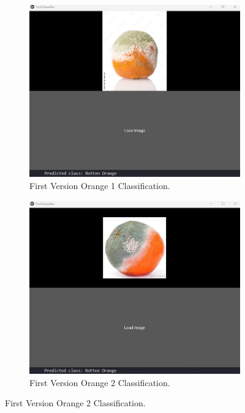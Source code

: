 \documentclass[conference]{IEEEtran}
\begin{document}
\begin{figure}[h]
\begin{subfigure}[b]{0.48\linewidth}
        \label{figFB}
    \end{subfigure}
    \hfill
    \begin{subfigure}[b]{0.48\linewidth}
        \centering
        \includegraphics[width=\linewidth]{1layer orageR1.png}
        \caption{First Version Orange 1 Classification.}
        \label{figFA}
    \end{subfigure}
    \hfill
    \begin{subfigure}[b]{0.48\linewidth}
        \centering
        \includegraphics[width=\linewidth]{1layer orageR2.png}
        \caption{First Version Orange 2 Classification.}

\end{subfigure}
\end{figure}
\end{document}

